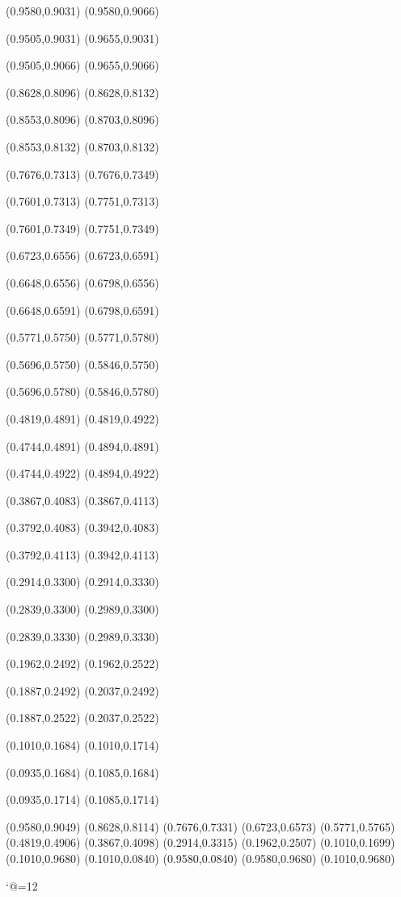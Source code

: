 \PST@Dashed(0.9580,0.9031)
(0.9580,0.9066)

\PST@Dashed(0.9505,0.9031)
(0.9655,0.9031)

\PST@Dashed(0.9505,0.9066)
(0.9655,0.9066)

\PST@Dashed(0.8628,0.8096)
(0.8628,0.8132)

\PST@Dashed(0.8553,0.8096)
(0.8703,0.8096)

\PST@Dashed(0.8553,0.8132)
(0.8703,0.8132)

\PST@Dashed(0.7676,0.7313)
(0.7676,0.7349)

\PST@Dashed(0.7601,0.7313)
(0.7751,0.7313)

\PST@Dashed(0.7601,0.7349)
(0.7751,0.7349)

\PST@Dashed(0.6723,0.6556)
(0.6723,0.6591)

\PST@Dashed(0.6648,0.6556)
(0.6798,0.6556)

\PST@Dashed(0.6648,0.6591)
(0.6798,0.6591)

\PST@Dashed(0.5771,0.5750)
(0.5771,0.5780)

\PST@Dashed(0.5696,0.5750)
(0.5846,0.5750)

\PST@Dashed(0.5696,0.5780)
(0.5846,0.5780)

\PST@Dashed(0.4819,0.4891)
(0.4819,0.4922)

\PST@Dashed(0.4744,0.4891)
(0.4894,0.4891)

\PST@Dashed(0.4744,0.4922)
(0.4894,0.4922)

\PST@Dashed(0.3867,0.4083)
(0.3867,0.4113)

\PST@Dashed(0.3792,0.4083)
(0.3942,0.4083)

\PST@Dashed(0.3792,0.4113)
(0.3942,0.4113)

\PST@Dashed(0.2914,0.3300)
(0.2914,0.3330)

\PST@Dashed(0.2839,0.3300)
(0.2989,0.3300)

\PST@Dashed(0.2839,0.3330)
(0.2989,0.3330)

\PST@Dashed(0.1962,0.2492)
(0.1962,0.2522)

\PST@Dashed(0.1887,0.2492)
(0.2037,0.2492)

\PST@Dashed(0.1887,0.2522)
(0.2037,0.2522)

\PST@Dashed(0.1010,0.1684)
(0.1010,0.1714)

\PST@Dashed(0.0935,0.1684)
(0.1085,0.1684)

\PST@Dashed(0.0935,0.1714)
(0.1085,0.1714)

\PST@Diamond(0.9580,0.9049)
\PST@Diamond(0.8628,0.8114)
\PST@Diamond(0.7676,0.7331)
\PST@Diamond(0.6723,0.6573)
\PST@Diamond(0.5771,0.5765)
\PST@Diamond(0.4819,0.4906)
\PST@Diamond(0.3867,0.4098)
\PST@Diamond(0.2914,0.3315)
\PST@Diamond(0.1962,0.2507)
\PST@Diamond(0.1010,0.1699)
\PST@Border(0.1010,0.9680)
(0.1010,0.0840)
(0.9580,0.0840)
(0.9580,0.9680)
(0.1010,0.9680)

\catcode`@=12
\fi
\endpspicture
